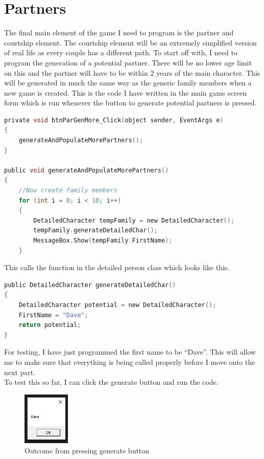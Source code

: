 \section{Partners}
The final main element of the game I need to program is the partner and courtship element. The courtship element will be an extremely simplified version of real life as every couple has a different path.
To start off with, I need to program the generation of a potential partner. There will be no lower age limit on this and the partner will have to be within 2 years of the main character. This will be generated in much the same way as the generic family members when a new game is created.
This is the code I have written in the main game screen form which is run whenever the button to generate potential partners is pressed.
\begin{lstlisting}[language=c, style=csharp, caption=Code to generate more potential partners]
private void btnParGenMore_Click(object sender, EventArgs e)
{
    generateAndPopulateMorePartners();
}

public void generateAndPopulateMorePartners()
{
    //Now create family members
    for (int i = 0; i < 10; i++)
    {
        DetailedCharacter tempFamily = new DetailedCharacter(); 
        tempFamily.generateDetailedChar(); 
        MessageBox.Show(tempFamily.FirstName);
    }
\end{lstlisting}
This calls the function in the detailed person class which looks like this.
\begin{lstlisting}[language=c, style=csharp, caption=Detailed char class code to generate a partner]
public DetailedCharacter generateDetailedChar()
{
    DetailedCharacter potential = new DetailedCharacter();
    FirstName = "Dave";
    return potential;
}
\end{lstlisting}
For testing, I have just programmed the first name to be “Dave”. This will allow me to make sure that everything is being called properly before I move onto the next part.\\
To test this so far, I can click the generate button and run the code.
\begin{figure}[H]
    \centering
    \includegraphics[width=0.2\textwidth]{images/implementation/partners1.png}
    \caption{Outcome from pressing generate button}
    \label{fig:implementation-partners1}
\end{figure}

